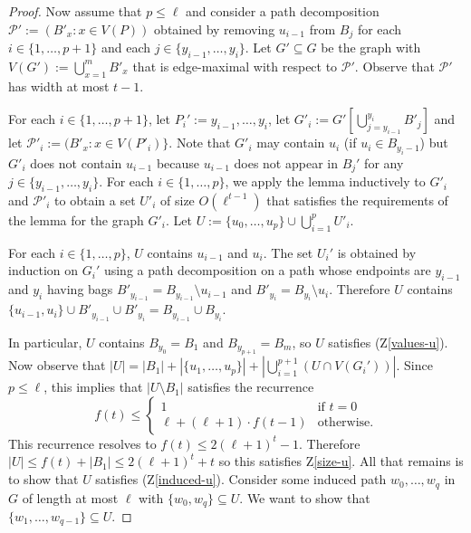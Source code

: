 \documentclass[kpfonts]{patmorin}
\theoremstyle{named}
\begin{document}
\begin{proof}
    Now assume that $p\le\ell$ and consider a path decomposition $\mathcal{P'}:=(B'_x:x\in V(P))$  obtained by removing $u_{i-1}$ from $B_{j}$ for each $i\in\{1,\ldots,p+1\}$ and each $j\in\{y_{i-1},\ldots,y_{i}\}$. Let $G'\subseteq G$ be the graph with $V(G'):=\bigcup_{x=1}^m B'_x$ that is edge-maximal with respect to $\mathcal{P}'$.  Observe that $\mathcal{P'}$ has width at most $t-1$.

    For each $i\in\{1,\ldots,p+1\}$, let $P_i':=y_{i-1},\ldots,y_i$, let $G'_i:=G'[\bigcup_{j=y_{i-1}}^{y_i}B'_j]$ and let $\mathcal{P}'_i:=(B'_x:x\in V(P'_i)\}$. Note that $G'_i$ may contain $u_i$ (if $u_i\in B_{y_i-1}$) but $G'_i$ does not contain $u_{i-1}$ because $u_{i-1}$ does not appear in $B_j'$ for any $j\in\{y_{i-1},\ldots,y_i\}$.  For each $i\in\{1,\ldots,p\}$, we apply the lemma inductively to $G'_i$ and $\mathcal{P}'_i$ to obtain a set $U'_i$ of size $O(\ell^{t-1})$ that satisfies the requirements of the lemma for the graph $G'_i$. Let $U:=\{u_0,\ldots,u_p\}\cup\bigcup_{i=1}^p U'_i$.

    For each $i\in\{1,\ldots,p\}$, $U$ contains $u_{i-1}$ and $u_i$. The set $U_i'$ is obtained by induction on $G_i'$ using a path decomposition on a path whose endpoints are $y_{i-1}$ and $y_i$ having bags $B'_{y_{i-1}}=B_{y_{i-1}}\setminus u_{i-1}$ and $B'_{y_{i}}=B_{y_{i}}\setminus u_{i}$.  Therefore $U$ contains $\{u_{i-1},u_i\}\cup B'_{y_{i-1}}\cup B'_{y_i}=B_{y_{i-1}}\cup B_{y_i}$.

    In particular, $U$ contains $B_{y_0}=B_1$ and $B_{y_{p+1}}=B_m$, so $U$ satisfies (Z\ref{values-u}).
    Now observe that $|U|=|B_1| + |\{u_1,\ldots,u_p\}|+ |\bigcup_{i=1}^{p+1}(U\cap V(G_i'))|$.  Since $p\le \ell$, this implies that $|U\setminus B_1|$ satisfies the recurrence
    \[
       f(t) \le \begin{cases}
                  1 & \text{if $t=0$} \\
                  \ell + (\ell+1)\cdot f(t-1) & \text{otherwise.}
                \end{cases}
    \]
    This recurrence resolves to $f(t)\le 2(\ell+1)^t - 1$.  Therefore $|U|\le f(t)+|B_{1}| \le 2(\ell+1)^t + t$ so this satisfies Z\ref{size-u}.  All that remains is to show that $U$ satisfies (Z\ref{induced-u}).  Consider some induced path $w_0,\ldots,w_q$ in $G$ of length at most $\ell$ with $\{w_0,w_q\}\subseteq U$.  We want to show that $\{w_1,\ldots,w_{q-1}\}\subseteq U$.


\end{proof}
\end{document}
